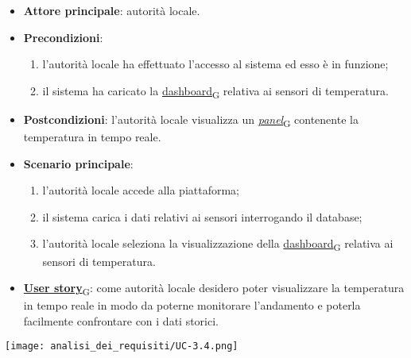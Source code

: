 \newpage

\begin{itemize}
	\item \textbf{Attore principale}: autorità locale.
	\item \textbf{Precondizioni}:
	      \begin{enumerate}
		      \item l'autorità locale ha effettuato l'accesso al sistema ed esso è in funzione;
		      \item il sistema ha caricato la \href{https://7last.github.io/docs/rtb/documentazione-interna/glossario\#dashboard}{dashboard\textsubscript{G}} relativa ai sensori di temperatura.
	      \end{enumerate}
	\item \textbf{Postcondizioni}: l'autorità locale visualizza un \href{https://7last.github.io/docs/rtb/documentazione-interna/glossario\#panel}{\textit{panel}\textsubscript{G}} contenente la temperatura in tempo reale.
	\item \textbf{Scenario principale}:
	      \begin{enumerate}
		      \item l'autorità locale accede alla piattaforma;
		      \item il sistema carica i dati relativi ai sensori interrogando il database;
		      \item l'autorità locale seleziona la visualizzazione della \href{https://7last.github.io/docs/rtb/documentazione-interna/glossario\#dashboard}{dashboard\textsubscript{G}} relativa ai sensori di temperatura.
	      \end{enumerate}
	\item \href{https://7last.github.io/docs/rtb/documentazione-interna/glossario\#user-story}{\textbf{User story}\textsubscript{G}}:
	      come autorità locale desidero poter visualizzare la temperatura in tempo reale in modo da poterne monitorare l'andamento
	      e poterla facilmente confrontare con i dati storici.
\end{itemize}
\begin{center}
	\texttt{[image: analisi\_dei\_requisiti/UC-3.4.png]}
\end{center}


